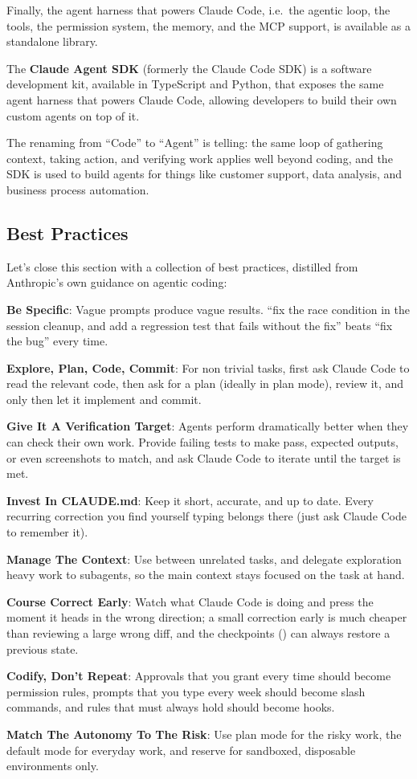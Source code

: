 Finally, the agent harness that powers Claude Code, i.e.\ the agentic loop, the tools, the permission system, the
memory, and the MCP support, is available as a standalone library.

The \textbf{Claude Agent SDK} (formerly the Claude Code SDK) is a software development kit, available in TypeScript
and Python, that exposes the same agent harness that powers Claude Code, allowing developers to build their own
custom agents on top of it.
\ed

The renaming from ``Code'' to ``Agent'' is telling: the same loop of gathering context, taking action, and verifying
work applies well beyond coding, and the SDK is used to build agents for things like customer support, data analysis,
and business process automation.

\subsection{Best Practices}

Let's close this section with a collection of best practices, distilled from Anthropic's own guidance on agentic
coding:
\bit
\item \textbf{Be Specific}: Vague prompts produce vague results. ``fix the race condition in the session cleanup, and
add a regression test that fails without the fix'' beats ``fix the bug'' every time.
\item \textbf{Explore, Plan, Code, Commit}: For non trivial tasks, first ask Claude Code to read the relevant code,
then ask for a plan (ideally in plan mode), review it, and only then let it implement and commit.
\item \textbf{Give It A Verification Target}: Agents perform dramatically better when they can check their own work.
Provide failing tests to make pass, expected outputs, or even screenshots to match, and ask Claude Code to iterate
until the target is met.
\item \textbf{Invest In CLAUDE.md}: Keep it short, accurate, and up to date. Every recurring correction you find
yourself typing belongs there (just ask Claude Code to remember it).
\item \textbf{Manage The Context}: Use  between unrelated tasks, and delegate exploration heavy work to
subagents, so the main context stays focused on the task at hand.
\item \textbf{Course Correct Early}: Watch what Claude Code is doing and press  the moment it heads in the
wrong direction; a small correction early is much cheaper than reviewing a large wrong diff, and the checkpoints
() can always restore a previous state.
\item \textbf{Codify, Don't Repeat}: Approvals that you grant every time should become permission rules, prompts that
you type every week should become slash commands, and rules that must always hold should become hooks.
\item \textbf{Match The Autonomy To The Risk}: Use plan mode for the risky work, the default mode for everyday work,
and reserve  for sandboxed, disposable environments only.
\eit

